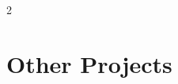 \documentclass[lighthipster]{simplehipstercv}
\newlength{\rightcolwidth}
\begin{document}
\begin{paracol}{2}
		\setlength{\parindent}{0pt}

	\end{paracol}

	\section*{Other Projects}
	\vspace{-0.4cm}
\end{document}
